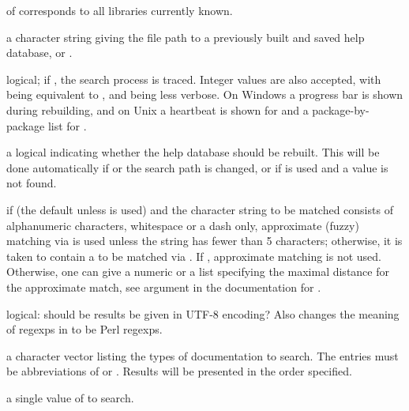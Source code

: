\begin{Arguments}
\begin{ldescription}
of  corresponds to all libraries currently known.
\item[\code{help.db}] a character string giving the file path to a previously
built and saved help database, or .
\item[\code{verbose}] logical; if , the search process is traced.
Integer values are also accepted, with  being equivalent
to , and  being less verbose.  On Windows a progress
bar is shown during rebuilding, and on Unix a heartbeat is shown for
 and a package-by-package list for
.
\item[\code{rebuild}] a logical indicating whether the help database should
be rebuilt.  This will be done automatically if  or
the search path is changed, or if  is used and a value
is not found.
\item[\code{agrep}] if  (the default unless  is
used) and the character string to
be matched consists of alphanumeric characters, whitespace or a dash
only, approximate (fuzzy) matching via  is used
unless the string has fewer than 5 characters; otherwise, it is
taken to contain a  to be matched via
.  If , approximate matching is not
used.  Otherwise, one can give a numeric or a list specifying the
maximal distance for the approximate match, see argument
 in the documentation for .
\item[\code{use\_UTF8}] logical: should be results be given in UTF-8 encoding?
Also changes the meaning of regexps in  to be Perl regexps.
\item[\code{types}] a character vector listing the types of documentation
to search.  The entries must be abbreviations of 
 or . Results will be presented in the 
order specified.
\item[\code{field}] a single value of  to search.
\end{ldescription}
\end{Arguments}
%
